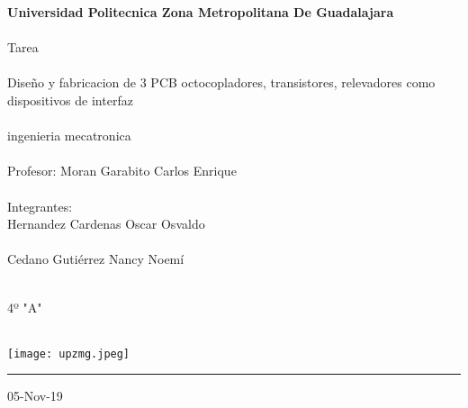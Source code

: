 \documentclass[a4paper,11pt,titlepage]{article}
\begin{document}
\begin{titlepage}
  \vspace*{1cm}
  {\fontsize{15}{34}\selectfont\bfseries Universidad Politecnica Zona Metropolitana De Guadalajara} \\\\
  {\large Tarea}\\\\
  {\large Diseño y fabricacion de 3 PCB octocopladores, transistores, relevadores como dispositivos de interfaz} \\\\
  {\large ingenieria mecatronica} \\\\
  \large {Profesor: Moran Garabito Carlos Enrique} \\\\
  {\large Integrantes:} \\
  {\large Hernandez Cardenas Oscar Osvaldo} \\\\
  {\large Cedano Gutiérrez Nancy Noemí} \\\
  
  {\large 4º "A"} \\\
   
  \hfill
  \texttt{[image: upzmg.jpeg]} \\
  {\color{gris}\hrule}
 
  \vfill
   {\hfill 05-Nov-19} \\
   

                                                                                                                                                                                                                                                                                                                                                                                                        
   
\end{titlepage}
\end{document}
